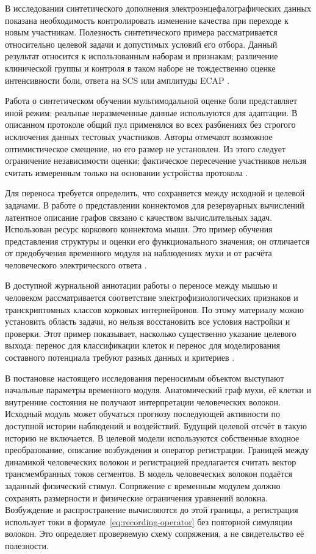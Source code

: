 В исследовании синтетического дополнения электроэнцефалографических данных показана необходимость контролировать изменение качества при переходе к новым участникам. Полезность синтетического примера рассматривается относительно целевой задачи и допустимых условий его отбора. Данный результат относится к использованным наборам и признакам; различение клинической группы и контроля в таком наборе не тождественно оценке интенсивности боли, ответа на SCS или амплитуды ECAP \cite{s836}.

Работа о синтетическом обучении мультимодальной оценке боли представляет иной режим: реальные неразмеченные данные используются для адаптации. В описанном протоколе общий пул применялся во всех разбиениях без строгого исключения данных тестовых участников. Авторы отмечают возможное оптимистическое смещение, но его размер не установлен. Из этого следует ограничение независимости оценки; фактическое пересечение участников нельзя считать измеренным только на основании устройства протокола \cite{s149}.

Для переноса требуется определить, что сохраняется между исходной и целевой задачами. В работе о представлении коннектомов для резервуарных вычислений латентное описание графов связано с качеством вычислительных задач. Использован ресурс коркового коннектома мыши. Это пример обучения представления структуры и оценки его функционального значения; он отличается от предобучения временного модуля на наблюдениях мухи и от расчёта человеческого электрического ответа \cite{s892}.

В доступной журнальной аннотации работы о переносе между мышью и человеком рассматривается соответствие электрофизиологических признаков и транскриптомных классов корковых интернейронов. По этому материалу можно установить область задачи, но нельзя восстановить все условия настройки и проверки. Этот пример показывает, насколько существенно указание целевого выхода: перенос для классификации клеток и перенос для моделирования составного потенциала требуют разных данных и критериев \cite{s873}.

В постановке настоящего исследования переносимым объектом выступают начальные параметры временного модуля. Анатомический граф мухи, её клетки и внутренние состояния не получают интерпретации человеческих волокон. Исходный модуль может обучаться прогнозу последующей активности по доступной истории наблюдений и воздействий. Будущий целевой отсчёт в такую историю не включается. В целевой модели используются собственные входное преобразование, описание возбуждения и оператор регистрации. Границей между динамикой человеческих волокон и регистрацией предлагается считать вектор трансмембранных токов сегментов. В модель человеческих волокон подаётся заданный физический стимул. Сопряжение с временным модулем должно сохранять размерности и физические ограничения уравнений волокна. Возбуждение и распространение вычисляются до этой границы, а регистрация использует токи в формуле~\eqref{eq:recording-operator} без повторной симуляции волокон. Это определяет проверяемую схему сопряжения, а не свидетельство её полезности.

